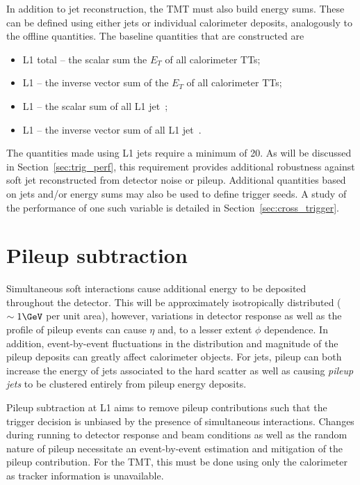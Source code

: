In addition to jet reconstruction, the TMT must also build energy sums. 
These can be defined using either jets or individual calorimeter deposits, analogously to
the offline quantities. The baseline quantities that are constructed are

\begin{itemize}
\item L1 total \Et -- the scalar sum the $E_T$ of all calorimeter TTs;
\item L1 \met -- the inverse vector sum of the $E_T$ of all calorimeter TTs;
\item L1 \scalht -- the scalar sum of all L1 jet~\pt;
\item L1 \mht -- the inverse vector sum of all L1 jet~\pt.
\end{itemize}

The quantities made using L1 jets require a minimum \pt of 20\GeV. As will be discussed in 
Section~\ref{sec:trig_perf}, this requirement provides additional robustness against soft
jet reconstructed from detector noise or pileup. Additional quantities based 
on jets and/or energy sums may also be used to define trigger seeds. 
A study of the performance of one such variable is detailed in Section~\ref{sec:cross_trigger}.

\section{Pileup subtraction}
\label{sec:pileup_algo}
Simultaneous soft interactions cause additional energy to be deposited throughout
the detector. This will be approximately isotropically distributed ($\sim1\GeV$ per unit area), however, variations
in detector response as well as the profile of pileup events can cause $\eta$ and,
to a lesser extent $\phi$ dependence. In addition, event-by-event fluctuations in the distribution 
and magnitude of the pileup deposits can greatly affect calorimeter objects. 
For jets, pileup can both increase the energy of jets associated to the hard 
scatter as well as causing \emph{pileup jets} to be clustered 
entirely from pileup energy deposits.

Pileup subtraction at L1 aims to remove pileup contributions such that the trigger
decision is unbiased by the presence of simultaneous interactions. Changes during running
to detector response and beam conditions as well as the random nature of pileup necessitate an event-by-event
estimation and mitigation of the pileup contribution. For the TMT, this must be done using only the calorimeter as 
tracker information is unavailable. 


